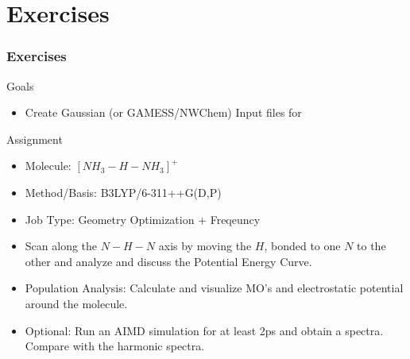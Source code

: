 \documentclass[slidestop,mathserif,compress,xcolor=svgnames]{beamer}
\begin{document}
\section{Exercises}
\begin{frame}
  \frametitle{\small Exercises}
  {\scriptsize
  \begin{exampleblock}{Goals}
    \begin{itemize}
      \item Create Gaussian (or GAMESS/NWChem) Input files for 
    \end{itemize}
  \end{exampleblock}
  \begin{block}{Assignment}
    \begin{itemize}
      \item Molecule: $[NH_3-H-NH_3]^+$
      \item Method/Basis: B3LYP/6-311++G(D,P)
      \item Job Type: Geometry Optimization + Freqeuncy
      \item Scan along the $N-H-N$ axis by moving the $H$, bonded to one $N$ to the other and analyze and discuss  the Potential Energy Curve.
      \item Population Analysis: Calculate and visualize MO's and electrostatic potential around the molecule.
      \item Optional: Run an AIMD simulation for at least 2ps and obtain a spectra. Compare with the harmonic spectra.
    \end{itemize}
  \end{block}
  }
\end{frame}
\end{document}
